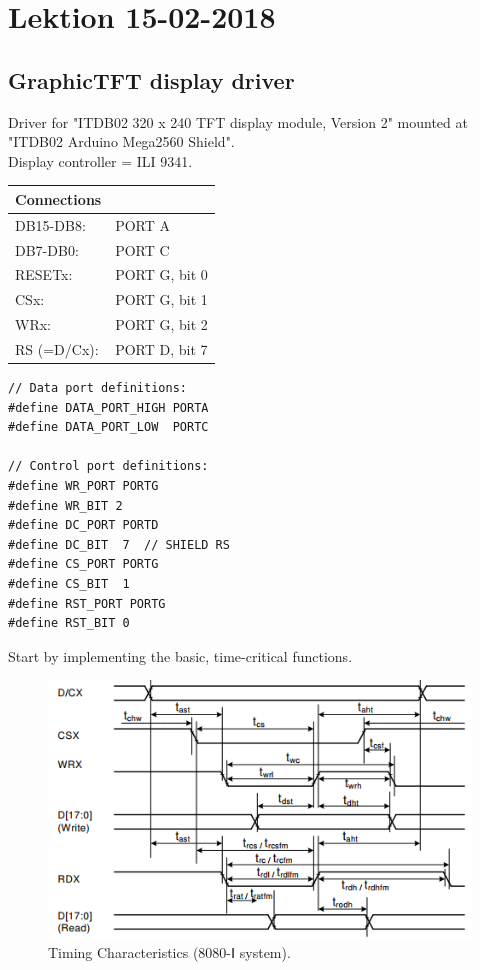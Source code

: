 \section{Lektion 15-02-2018}
\subsection{GraphicTFT display driver}

Driver for "ITDB02 320 x 240 TFT display module, Version 2" mounted at "ITDB02 Arduino Mega2560 Shield".\\

\noindent Display controller = ILI 9341.\\

\begin{tabular}{ll}
	\textbf{Connections}\\
	\hline
	\rule{0pt}{5mm}  
	DB15-DB8:   & PORT A\\ 
	\rule{0pt}{5mm}
	DB7-DB0:    & PORT C\\ 
	\rule{0pt}{5mm}
	RESETx:     & PORT G, bit 0\\ 
	\rule{0pt}{5mm}
	CSx:        & PORT G, bit 1\\ 
	\rule{0pt}{5mm}
	WRx:        & PORT G, bit 2\\ 
	\rule{0pt}{5mm}
	RS (=D/Cx): & PORT D, bit 7\\ 
\end{tabular} 

\begin{verbatim}
// Data port definitions:
#define DATA_PORT_HIGH PORTA
#define DATA_PORT_LOW  PORTC

// Control port definitions:
#define WR_PORT PORTG
#define WR_BIT 2
#define DC_PORT PORTD
#define DC_BIT  7  // SHIELD RS
#define CS_PORT PORTG
#define CS_BIT  1
#define RST_PORT PORTG
#define RST_BIT 0
\end{verbatim}
Start by implementing the basic, time-critical functions.

\begin{figure} [H]
	\centering
	\includegraphics[width=0.8\linewidth]{graphics/LAB3a.png}
	\caption{Timing Characteristics (8080-Ⅰ system).}
	\label{fig:11}
\end{figure}

